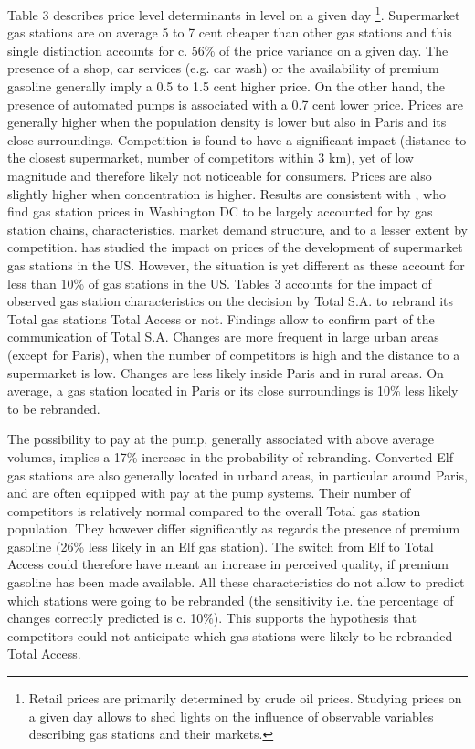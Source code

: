 \documentclass[english]{article}
\begin{document}
Table 3 describes price level determinants in level on a given day%
\footnote{Retail prices are primarily determined by crude oil prices. Studying prices on a given day allows to shed lights on the influence of observable variables describing gas stations and their markets.%
}. Supermarket gas stations are on average 5 to 7 cent cheaper than other gas stations and this single distinction accounts for c. 56\% of the price variance on a given day. The presence of a shop, car services (e.g. car wash) or the availability of premium gasoline generally imply a 0.5 to 1.5 cent higher price. On the other hand, the presence of automated pumps is associated with a 0.7 cent lower price. Prices are generally higher when the population density is lower but also in Paris and its close surroundings. Competition is found to have a significant impact (distance to the closest supermarket, number of competitors within 3 km), yet of low magnitude and therefore likely not noticeable for consumers. Prices are also slightly higher when concentration is higher. Results are consistent with \cite{HOS08}, who find gas station prices in Washington DC to be largely accounted for by gas station chains, characteristics, market demand structure, and to a lesser extent by competition. \cite{ZIM12} has studied the impact on prices of the development of supermarket gas stations in the US. However, the situation is yet different as these account for less than 10\% of gas stations in the US. Tables 3 accounts for the impact of observed gas station characteristics on the decision by Total S.A. to rebrand its Total gas stations Total Access or not. Findings allow to confirm part of the communication of Total S.A. Changes are more frequent in large urban areas (except for Paris), when the number of competitors is high and the distance to a supermarket is low. Changes are less likely inside Paris and in rural areas. On average, a gas station located in Paris or its close surroundings is 10\% less likely to be rebranded.

The possibility to pay at the pump, generally associated with above average volumes, implies a 17\% increase in the probability of rebranding. Converted Elf gas stations are also generally located in urband areas, in particular around Paris, and are often equipped with pay at the pump systems. Their number of competitors is relatively normal compared to the overall Total gas station population. They however differ significantly as regards the presence of premium gasoline (26\% less likely in an Elf gas station). The switch from Elf to Total Access could therefore have meant an increase in perceived quality, if premium gasoline has been made available. All these characteristics do not allow to predict which stations were going to be rebranded (the sensitivity i.e. the percentage of changes correctly predicted is c. 10\%). This supports the hypothesis that competitors could not anticipate which gas stations were likely to be rebranded Total Access. \medskip{}
\end{document}

